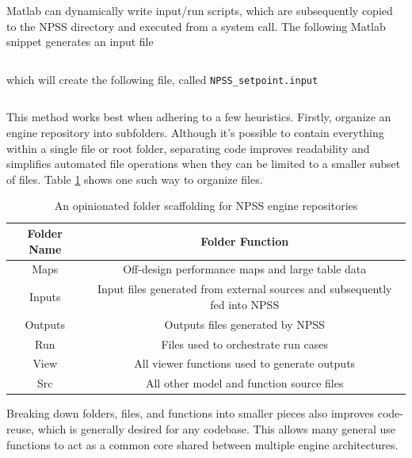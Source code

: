 \documentclass[heading.tex]{subfiles}
\begin{document}
Matlab can dynamically write input/run scripts, which are subsequently
copied to the NPSS directory and executed from a system call.
The following Matlab snippet generates an input file

 \begin{adjustwidth}{-1cm}{-1cm}
 \inputminted[]{matlab}{code/dlmwrite.m}
 \end{adjustwidth} 

which will create the following file, called \texttt{NPSS\_setpoint.input}

 \begin{adjustwidth}{-1cm}{-1cm}
 \inputminted[]{matlab}{code/dlmOutput.m}
 \end{adjustwidth} 


This method works best when adhering to a few heuristics. Firstly, organize an engine repository
into subfolders. Although it's possible to contain everything within a single file or root folder, separating code
improves readability and simplifies automated file operations when they can be limited to a smaller subset of files.
Table \ref{tab:Scaffolding} shows one such way to organize files.

\begin{table}[H]
\centering
\begin{tabular}{|c|c|}
\hline 
Folder Name & Folder Function \\ 
\hline \hline
Maps & Off-design performance maps and large table data \\ 
\hline 
Inputs & Input files generated from external sources and subsequently fed into NPSS \\ 
\hline 
Outputs & Outputs files generated by NPSS \\ 
\hline 
Run & Files used to orchestrate run cases \\ 
\hline 
View & All viewer functions used to generate outputs \\ 
\hline 
Src & All other model and function source files \\ 
\hline 
\end{tabular} 
\caption{An opinionated folder scaffolding for NPSS engine repositories}
\label{tab:Scaffolding}
\end{table}

Breaking down folders, files, and functions into smaller pieces also improves code-reuse,
which is generally desired for any codebase.
This allows many general use functions to act as a common core shared between multiple engine architectures.
\end{document}
